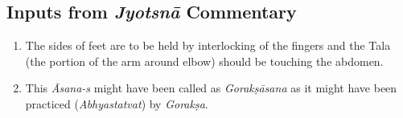 \subsection*{Inputs from \textit{Jyotsnā} Commentary}
\vspace{-10pt}

\begin{enumerate}
\itemsep=0pt
\item The sides of feet are to be held by interlocking of the fingers and the Tala (the portion of the arm around elbow) should be touching the abdomen. 
\item This \textit{Āsana-s} might have been called as \textit{Gorakṣāsana} as it might have been practiced (\textit{Abhyastatvat}) by \textit{Gorakṣa}. 
\end{enumerate}
